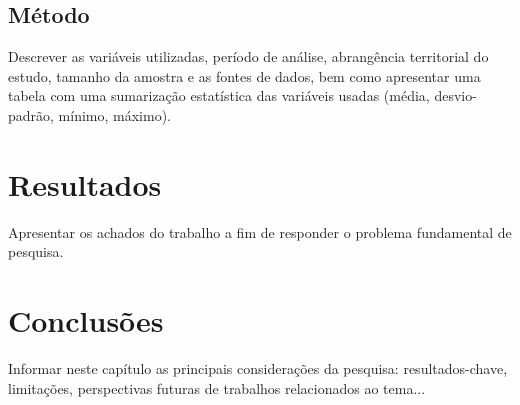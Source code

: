 \section{Método}
Descrever as variáveis utilizadas, período de análise, abrangência territorial do estudo, tamanho da amostra e as fontes de dados, bem como apresentar uma tabela com uma sumarização estatística das variáveis usadas (média, desvio-padrão, mínimo, máximo).

\chapter{Resultados}
Apresentar os achados do trabalho a fim de responder o problema fundamental de pesquisa.

\chapter{Conclusões}
Informar neste capítulo as principais considerações da pesquisa: resultados-chave, limitações, perspectivas futuras de trabalhos relacionados ao tema...



